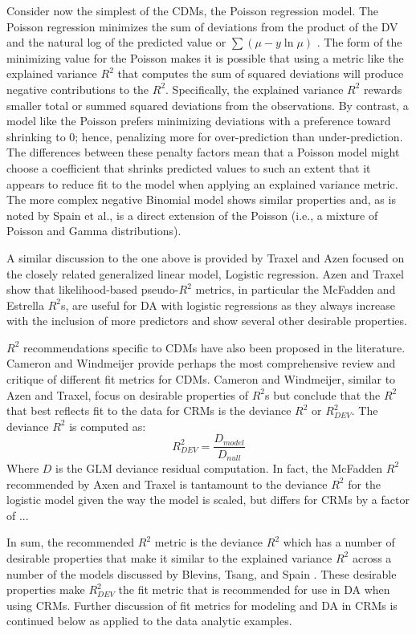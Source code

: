 \documentclass[ShortAfour,times,sageapa]{sagej}
\begin{document}
	Consider now the simplest of the CDMs, the Poisson regression model. The Poisson regression minimizes the sum of deviations from the product of the DV and the natural log of the predicted value or $\sum (\mu - y \ln \mu)$ \cite{cameron1996r}. The form of the minimizing value for the Poisson makes it is possible that using a metric like the explained variance $R^2$ that computes the sum of squared deviations will produce negative contributions to the $R^2$.
	Specifically, the explained variance $R^2$ rewards smaller total or summed squared deviations from the observations.
	By contrast, a model like the Poisson prefers minimizing deviations with a preference toward shrinking to 0; hence, penalizing more for over-prediction than under-prediction.
	The differences between these penalty factors mean that a Poisson model might choose a coefficient that shrinks predicted values to such an extent that it appears to reduce fit to the model when applying an explained variance metric.
	The more complex negative Binomial model shows similar properties and, as is noted by Spain et al., is a direct extension of the Poisson (i.e., a mixture of Poisson and Gamma distributions).
	
	A similar discussion to the one above is provided by Traxel and Azen \cite{azen2009using} focused on the closely related generalized linear model, Logistic regression.  
	Azen and Traxel show that likelihood-based pseudo-$R^2$ metrics, in particular the McFadden and Estrella $R^2$s, are useful for DA with logistic regressions as they always increase with the inclusion of more predictors and show several other desirable properties.
	
	$R^2$ recommendations specific to CDMs have also been proposed in the literature.  
	Cameron and Windmeijer \cite{cameron1996r} provide perhaps the most comprehensive review and critique of different fit metrics for CDMs.
	Cameron and Windmeijer, similar to Azen and Traxel, focus on desirable properties of $R^2$s but conclude that the $R^2$ that best reflects fit to the data for CRMs is the deviance $R^2$ or $R^{2}_{DEV}$.
	The deviance $R^2$ is computed as:
	$$R^{2}_{DEV} = \frac{D_{model}}{D_{null}}$$
	Where $D$ is the GLM deviance residual computation.
	In fact, the McFadden $R^2$ recommended by Axen and Traxel is tantamount to the deviance $R^2$ for the logistic model given the way the model is scaled, but differs for CRMs by a factor of ...
	
	In sum, the recommended $R^2$ metric is the deviance $R^2$ which has a number of desirable properties that make it similar to the explained variance $R^2$ across a number of the models discussed by Blevins, Tsang, and Spain \cite{blevins2015count}.  
	These desirable properties make $R^{2}_{DEV}$ the fit metric that is recommended for use in DA when using CRMs.  
	Further discussion of fit metrics for modeling and DA in CRMs is continued below as applied to the data analytic examples. 
	
\end{document}
